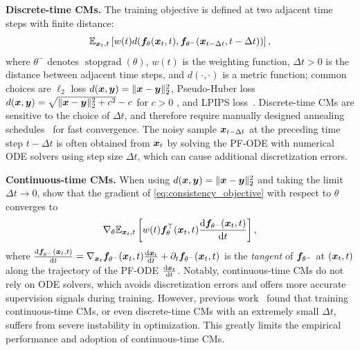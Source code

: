 \textbf{Discrete-time CMs. }
The training objective is defined at two adjacent time steps with finite distance:
\begin{equation}
\label{eq:consistency_objective}
    \mathbb{E}_{{\bm{x}}_t,t}\left[
    w(t) d({\bm{f}}_\theta({\bm{x}}_t,t), {\bm{f}}_{\theta^-}({\bm{x}}_{t-\Delta t}, t-\Delta t)) 
    \right],
\end{equation}
where $\theta^{-}$ denotes $\operatorname{stopgrad}(\theta)$, $w(t)$ is the weighting function, $\Delta t > 0$ is the distance between adjacent time steps, and $d(\cdot, \cdot)$ is a metric function; common choices are $\ell_2$ loss $d({\bm{x}},{\bm{y}})=\|{\bm{x}}-{\bm{y}}\|_2^2$, Pseudo-Huber loss $d({\bm{x}},{\bm{y}}) = \sqrt{\|{\bm{x}}-{\bm{y}}\|_2^2+c^2} - c$ for $c > 0$ \citep{song2023ict}, and LPIPS loss~\citep{zhang2018unreasonable}. Discrete-time CMs are sensitive to the choice of $\Delta t$, and therefore require manually designed annealing schedules~\citep{song2023ict,geng2024ect} for fast convergence. The noisy sample ${\bm{x}}_{t-\Delta t}$ at the preceding time step $t-\Delta t$ is often obtained from ${\bm{x}}_t$ by solving the PF-ODE with numerical ODE solvers using step size $\Delta t$, which can cause additional discretization errors.




\textbf{Continuous-time CMs. }
When using $d({\bm{x}},{\bm{y}}) = \| {\bm{x}} - {\bm{y}} \|_2^2$ and taking the limit $\Delta t \to 0$, \citet[\textit{Remark 10}]{song2023cm} show that the gradient of \eqref{eq:consistency_objective} with respect to $\theta$ converges to
\begin{equation}
\label{eq:gradient_cm_general}
    \nabla_\theta \mathbb{E}_{{\bm{x}}_t,t}\left[
        w(t) {\bm{f}}^\top_\theta({\bm{x}}_t,t) \frac{\mathrm{d} {\bm{f}}_{\theta^-}({\bm{x}}_t,t)}{\mathrm{d} t}
    \right],
\end{equation}
where $\frac{\mathrm{d} {\bm{f}}_{\theta^-}({\bm{x}}_t, t)}{\mathrm{d} t} = \nabla_{{\bm{x}}_t}{\bm{f}}_{\theta^-}({\bm{x}}_t, t) \frac{\mathrm{d} {\bm{x}}_t}{\mathrm{d} t} + \partial_t {\bm{f}}_{\theta^-}({\bm{x}}_t, t)$ is the \textit{tangent} of ${\bm{f}}_{\theta^-}$ at $({\bm{x}}_t, t)$ along the trajectory of the PF-ODE $\frac{\mathrm{d} {\bm{x}}_t}{\mathrm{d} t}$. Notably, continuous-time CMs do not rely on ODE solvers, which avoids discretization errors and offers more accurate supervision signals during training. However, previous work~\citep{song2023cm,geng2024ect} found that training continuous-time CMs, or even discrete-time CMs with an extremely small $\Delta t$, suffers from severe instability in optimization. This greatly limits the empirical performance and adoption of continuous-time CMs.

